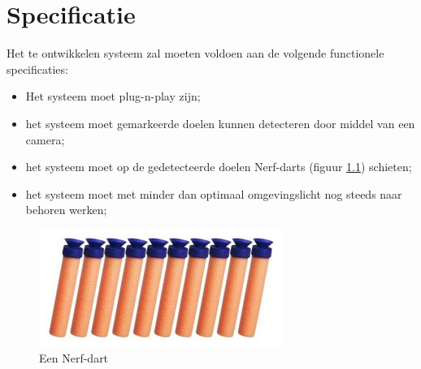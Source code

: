 \chapter{Specificatie}

Het te ontwikkelen systeem zal moeten voldoen aan de volgende functionele
specificaties:

\begin{itemize}
    \item Het systeem moet plug-n-play zijn;
    \item het systeem moet gemarkeerde doelen kunnen detecteren door middel van
        een camera;
    \item het systeem moet op de gedetecteerde doelen Nerf-darts (figuur
        \ref{fig:dart}) schieten;
    \item het systeem moet met minder dan optimaal omgevingslicht nog steeds
        naar behoren werken;
\end{itemize}

\begin{figure}
    \begin{center}
        \includegraphics{figures/darts.jpg}
    \end{center}
    \caption{Een Nerf-dart}
    \label{fig:dart}
\end{figure}
